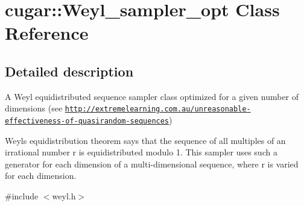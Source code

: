 \hypertarget{classcugar_1_1_weyl__sampler__opt}{}\section{cugar\+:\+:Weyl\+\_\+sampler\+\_\+opt Class Reference}
\label{classcugar_1_1_weyl__sampler__opt}


\subsection{Detailed description}
A Weyl equidistributed sequence sampler class optimized for a given number of dimensions (see \href{http://extremelearning.com.au/unreasonable-effectiveness-of-quasirandom-sequences}{\tt http\+://extremelearning.\+com.\+au/unreasonable-\/effectiveness-\/of-\/quasirandom-\/sequences})

Weyl\textquotesingle{}s equidistribution theorem says that the sequence of all multiples of an irrational number r is equidistributed modulo 1. This sampler uses such a generator for each dimension of a multi-\/dimensional sequence, where r is varied for each dimension. 

{\ttfamily \#include $<$weyl.\+h$>$}

